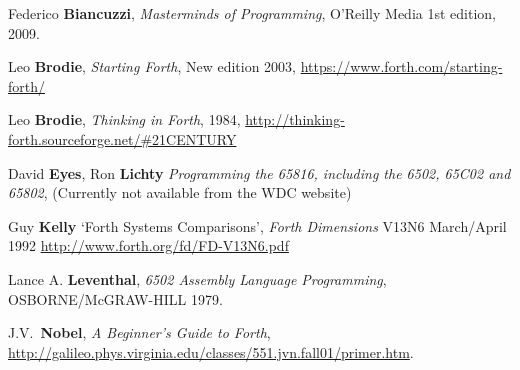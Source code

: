 \begin{thebibliography}{99}

        Federico \textbf{Biancuzzi},
  	\textit{Masterminds of Programming},
	O'Reilly Media
  	1st edition,
	2009.

        Leo \textbf{Brodie},
  	\textit{Starting Forth},
  	New edition 2003,
        \href{https://www.forth.com/starting-forth/}{https://www.forth.com/starting-forth/}

        Leo \textbf{Brodie},
  	\textit{Thinking in Forth},
  	1984,
        \href{http://thinking-forth.sourceforge.net/\#21CENTURY}{http://thinking-forth.sourceforge.net/\#21CENTURY}

        David \textbf{Eyes}, Ron \textbf{Lichty}
  	\textit{Programming the 65816, including the 6502, 65C02 and 65802},
        (Currently not available from the WDC website) 

        Guy \textbf{Kelly}
  	`Forth Systems Comparisons',
        \textit{Forth Dimensions} V13N6
        March/April 1992
        \href{http://www.forth.org/fd/FD-V13N6.pdf}{http://www.forth.org/fd/FD-V13N6.pdf}

        Lance A. \textbf{Leventhal},
  	\textit{6502 Assembly Language Programming},
	OSBORNE/McGRAW-HILL
	1979.

        J.V.~\textbf{Nobel},
  	\textit{A Beginner's Guide to Forth},
        \href{http://galileo.phys.virginia.edu/classes/551.jvn.fall01/primer.htm}{http://galileo.phys.virginia.edu/classes/551.jvn.fall01/primer.htm}.

\end{thebibliography}

